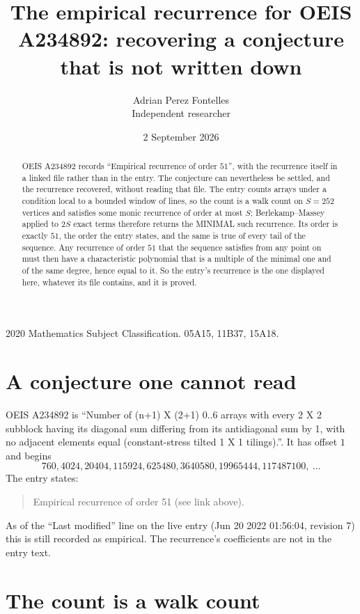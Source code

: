 \documentclass[11pt,a4paper]{article}
\title{The empirical recurrence for OEIS A234892: recovering a conjecture that is not written down}
\author{Adrian Perez Fontelles\\ \small Independent researcher}
\date{2 September 2026}
\theoremstyle{plain}
\theoremstyle{definition}
\begin{document}
\maketitle

\begin{abstract}
OEIS A234892 records ``Empirical recurrence of order $51$'', with the recurrence itself in a
linked file rather than in the entry. The conjecture can nevertheless be settled, and the
recurrence recovered, without reading that file. The entry counts arrays under a condition
local to a bounded window of lines, so the count is a walk count on $S=252$ vertices and
satisfies some monic recurrence of order at most $S$; Berlekamp--Massey applied to $2S$ exact
terms therefore returns the MINIMAL such recurrence. Its order is exactly $51$, the order
the entry states, and the same is true of every tail of the sequence. Any recurrence of order
$51$ that the sequence satisfies from any point on must then have a characteristic
polynomial that is a multiple of the minimal one and of the same degree, hence equal to it. So
the entry's recurrence is the one displayed here, whatever its file contains, and it is
proved.
\end{abstract}

\noindent\small 2020 Mathematics Subject Classification. 05A15, 11B37, 15A18.\normalsize

\section{A conjecture one cannot read}

OEIS A234892 is ``Number of (n+1) X (2+1) 0..6 arrays with every 2 X 2 subblock having its diagonal sum differing from its antidiagonal sum by 1, with no adjacent elements equal (constant-stress tilted 1 X 1 tilings).''. It has offset $1$ and begins
\[
760, 4024, 20404, 115924, 625480, 3640580, 19965444, 117487100,\ \dots
\]
The entry states:
\begin{quote}
Empirical recurrence of order 51 (see link above).
\end{quote}
As of the ``Last modified'' line on the live entry (Jun 20 2022 01:56:04, revision 7) this is still
recorded as empirical. The recurrence's coefficients are not in the entry text.

\section{The count is a walk count}
\end{document}
